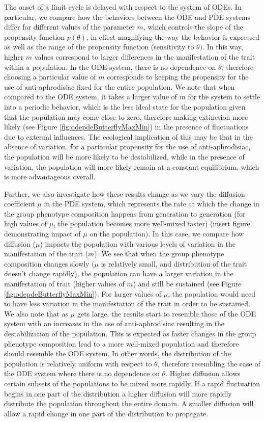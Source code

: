 \documentclass[review,authoryear]{elsarticle}
\begin{document}
The onset of a limit cycle is delayed with respect to the system of
ODEs. In particular, we compare how the behaviors between the ODE and PDE systems differ for different values of the parameter $m$, which controls the slope of the propensity function $p(\theta)$, in effect magnifying the way the behavior is expressed as well as the range of the propensity function (sensitivity to $\theta)$. In this way, higher $m$ values correspond to larger differences in the manifestation of the trait within a population. In the ODE system, there is no dependence on $\theta$, therefore choosing a particular value of $m$ corresponds to keeping the propensity for the use of anti-aphrodisiac fixed for the entire population. We note that when compared to the ODE system, it takes a larger value of $m$ for the system to settle into a periodic behavior, which is the less ideal state for the population given that the population may come close to zero, therefore making extinction more likely (see Figure \ref{fig:odepdeButterflyMaxMin}) in the presence of fluctuations due to external influences. The ecological implication of this may be that in the absence of variation, for a particular propensity for the use of anti-aphrodisiac, the population will be more likely to be destabilized, while in the presence of variation, the population will more likely remain at a constant equilibrium, which is more advantageous overall. 
\par Further, we also investigate how these results change as we vary the diffusion coefficient $\mu$ in the PDE system, which represents the rate at which the change in the group phenotype composition happens from generation to generation (for high values of $\mu$, the population becomes more well-mixed faster) (insert figure demonstrating impact of $\mu$ on the population). In this case, we compare how diffusion ($\mu$) impacts the population with various levels of variation in the manifestation of the trait ($m$). We see that when the group phenotype composition changes slowly ($\mu$ is relatively small, and distribution of the trait doesn't change rapidly), the population can have a larger variation in the manifestation of trait (higher values of $m$) and still be sustained (see Figure \ref{fig:odepdeButterflyMaxMin}). For larger values of $\mu$, the population would need to have less variation in the manifestation of the trait in order to be sustained. We also note that as $\mu$ gets large, the results start to resemble those of the ODE system with an increases in the use of anti-aphrodisiac resulting in the destabilization of the population. This is expected as faster changes in the group phenotype composition lead to a more well-mixed population and therefore should resemble the ODE system. In other words, the distribution of the population is relatively uniform with respect to $\theta$, therefore resembling the case of the ODE system where there is no dependence on $\theta$. Higher diffusion allows certain subsets of the populations to be mixed more rapidly. If a rapid fluctuation begins in one part of the distribution a higher diffusion will more rapidly distribute the population throughout the entire domain. A smaller diffusion will allow a rapid change  in one part of the distribution to propagate.
\end{document}
